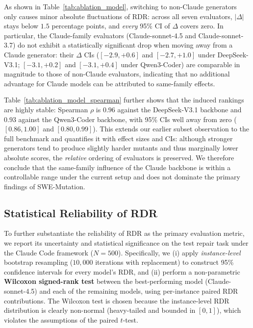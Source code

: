 \documentclass[11pt]{article}
\begin{document}
As shown in Table~\ref{tab:ablation_model}, switching to non-Claude generators only causes minor absolute fluctuations of RDR: across all seven evaluators, $|\Delta|$ stays below $1.5$ percentage points, and \emph{every} 95\% CI of $\Delta$ covers zero. In particular, the Claude-family evaluators (Claude-sonnet-4.5 and Claude-sonnet-3.7) do not exhibit a statistically significant drop when moving away from a Claude generator: their $\Delta$ CIs ($[-2.9,+0.6]$ and $[-2.7,+1.0]$ under DeepSeek-V3.1; $[-3.1,+0.2]$ and $[-3.1,+0.4]$ under Qwen3-Coder) are comparable in magnitude to those of non-Claude evaluators, indicating that no additional advantage for Claude models can be attributed to same-family effects.

Table~\ref{tab:ablation_model_spearman} further shows that the induced rankings are highly stable: Spearman $\rho$ is $0.96$ against the DeepSeek-V3.1 backbone and $0.93$ against the Qwen3-Coder backbone, with 95\% CIs well away from zero ($[0.86,1.00]$ and $[0.80,0.99]$). This extends our earlier subset observation to the full benchmark and quantifies it with effect sizes and CIs: although stronger generators tend to produce slightly harder mutants and thus marginally lower absolute scores, the \emph{relative} ordering of evaluators is preserved. We therefore conclude that the same-family influence of the Claude backbone is within a controllable range under the current setup and does not dominate the primary findings of SWE-Mutation.

\subsection{Statistical Reliability of RDR}
\label{sec:rdr_stats}

To further substantiate the reliability of RDR as the primary evaluation metric, we report its uncertainty and statistical significance on the test repair task under the Claude Code framework ($N{=}500$). Specifically, we (i) apply \emph{instance-level} bootstrap resampling ($10{,}000$ iterations with replacement) to construct 95\% confidence intervals for every model's RDR, and (ii) perform a non-parametric \textbf{Wilcoxon signed-rank test} between the best-performing model (Claude-sonnet-4.5) and each of the remaining models, using per-instance paired RDR contributions. The Wilcoxon test is chosen because the instance-level RDR distribution is clearly non-normal (heavy-tailed and bounded in $[0,1]$), which violates the assumptions of the paired $t$-test.
\end{document}
